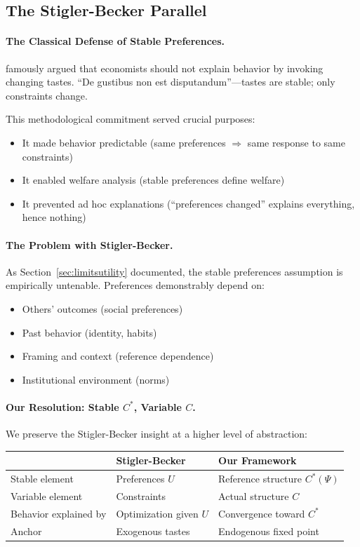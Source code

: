 \documentclass[12pt,a4paper]{article}
\begin{document}
\subsection{The Stigler-Becker Parallel}

\paragraph{The Classical Defense of Stable Preferences.}
\citet{stiglerbecker1977} famously argued that economists should not
explain behavior by invoking changing tastes.
``De gustibus non est disputandum''---tastes are stable; 
only constraints change.

This methodological commitment served crucial purposes:
\begin{itemize}
  \item It made behavior predictable (same preferences $\Rightarrow$ same response to same constraints)
  \item It enabled welfare analysis (stable preferences define welfare)
  \item It prevented ad hoc explanations (``preferences changed'' explains everything, hence nothing)
\end{itemize}

\paragraph{The Problem with Stigler-Becker.}
As Section~\ref{sec:limitsutility} documented, the stable preferences assumption
is empirically untenable. Preferences demonstrably depend on:
\begin{itemize}
  \item Others' outcomes (social preferences)
  \item Past behavior (identity, habits)
  \item Framing and context (reference dependence)
  \item Institutional environment (norms)
\end{itemize}

\paragraph{Our Resolution: Stable $C^*$, Variable $C$.}
We preserve the Stigler-Becker insight at a higher level of abstraction:

\begin{center}
\renewcommand{\arraystretch}{1.3}
\begin{tabular}{lll}
\hline
& \textbf{Stigler-Becker} & \textbf{Our Framework} \\
\hline
Stable element & Preferences $U$ & Reference structure $C^*(\Psi)$ \\
Variable element & Constraints & Actual structure $C$ \\
Behavior explained by & Optimization given $U$ & Convergence toward $C^*$ \\
Anchor & Exogenous tastes & Endogenous fixed point \\
\hline
\end{tabular}
\end{center}
\end{document}
